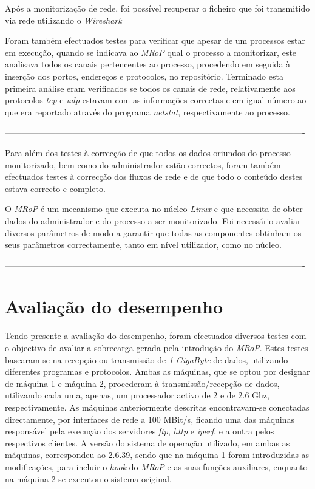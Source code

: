 Após a monitorização de rede, foi possível recuperar o ficheiro que foi transmitido via rede utilizando o \textit{Wireshark}

Foram também efectuados testes para verificar que apesar de um processos estar em execução, quando se indicava ao \textit{MRoP} qual o processo a monitorizar, este analisava todos os canais pertencentes ao processo, procedendo em seguida à inserção dos portos, endereços e protocolos, no repositório.
Terminado esta primeira análise eram verificados se todos os canais de rede, relativamente aos protocolos \textit{tcp} e \textit{udp} estavam com as informações correctas e em igual número ao que era reportado através do programa \textit{netstat}, respectivamente ao processo.


----------------------------------------------------------------------------------------------------------

Para além dos testes à correcção de que todos os dados oriundos do processo monitorizado, bem como do administrador estão correctos, foram também efectuados testes à correcção dos fluxos de rede e de que todo o conteúdo destes estava correcto e completo.

O \textit{MRoP} é um mecanismo que executa no núcleo \textit{Linux} e que necessita de obter dados do administrador e do processo a ser monitorizado.
Foi necessário avaliar diversos parâmetros de modo a garantir que todas as componentes obtinham os seus parâmetros correctamente, tanto em nível utilizador, como no núcleo.

----------------------------------------------------------------------------------------------------------


\section{Avaliação do desempenho}
\label{sec:eval_performance}

Tendo presente a avaliação do desempenho, foram efectuados diversos testes com o objectivo de avaliar a sobrecarga gerada pela introdução do \textit{MRoP}.
Estes testes basearam-se na recepção ou transmissão de \textit{1 GigaByte} de dados, utilizando diferentes programas e protocolos.
Ambas as máquinas, que se optou por designar de máquina 1 e máquina 2, procederam à transmissão/recepção de dados, utilizando cada uma, apenas, um processador activo de 2 e de 2.6 Ghz, respectivamente.
As máquinas anteriormente descritas encontravam-se conectadas directamente, por interfaces de rede a 100 MBit/s, ficando uma das máquinas responsável pela execução dos servidores \textit{ftp}, \textit{http} e \textit{iperf}, e a outra pelos respectivos clientes.
A versão do sistema de operação utilizado, em ambas as máquinas, correspondeu ao 2.6.39, sendo que na máquina 1 foram introduzidas as modificações, para incluir o \textit{hook} do \textit{MRoP} e as suas funções auxiliares, enquanto na máquina 2 se executou o sistema original.

